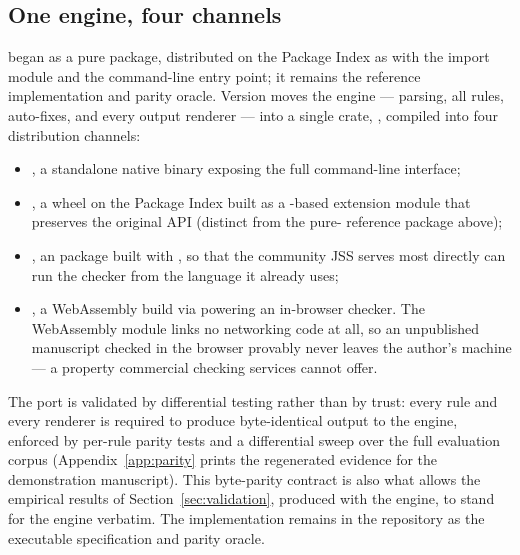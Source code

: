 \documentclass[nojss,article]{jss}
\begin{document}
\subsection{One engine, four channels}
\label{sec:channels}

 began as a pure  package, distributed
on the  Package Index as \pkg{\StatPyPIName} with the
import module  and the  command-line
entry point; it remains the reference implementation and parity
oracle. Version \StatToolVersion{} moves the engine --- parsing, all
\StatRuleCount{} rules, auto-fixes, and every output renderer --- into
a single  \citep{rustlang} crate, ,
compiled into four distribution channels:

\begin{itemize}
  \item {}, a standalone native binary exposing the
    full command-line interface;
  \item {}, a  wheel on the
     Package Index built as a -based
    extension module \citep{pyo3} that preserves the original
     API (distinct from the pure-
    \pkg{\StatPyPIName} reference package above);
  \item {}, an  package built with
     \citep{extendr}, so that the community JSS serves
    most directly can run the checker from the language it already
    uses;
  \item {}, a WebAssembly build via
     \citep{wasmbindgen} powering an in-browser
    checker. The WebAssembly module links no networking code at all,
    so an unpublished manuscript checked in the browser provably
    never leaves the author's machine --- a property commercial
    checking services cannot offer.
\end{itemize}

The port is validated by differential testing rather than by trust:
every rule and every renderer is required to produce byte-identical
output to the  engine, enforced by per-rule parity
tests and a differential sweep over the full evaluation corpus
(Appendix~\ref{app:parity} prints the regenerated evidence for the
demonstration manuscript). This
byte-parity contract is also what allows the empirical results of
Section~\ref{sec:validation}, produced with the 
engine, to stand for the  engine verbatim. The
 implementation remains in the repository as the
executable specification and parity oracle.
\end{document}
